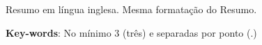 Resumo em língua inglesa. Mesma formatação do Resumo.

\vspace{\onelineskip}

\noindent 
\textbf{Key-words}: No mínimo 3 (três) e separadas por ponto (.) 
